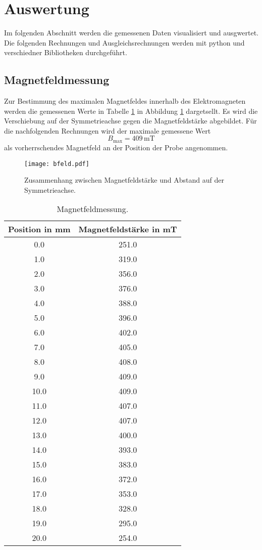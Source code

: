 \section{Auswertung}
\label{sec:Auswertung}

Im folgenden Abschnitt werden die gemessenen Daten visualisiert und ausgwertet.
Die folgenden Rechnungen und Ausgleichsrechnungen werden mit python und verschiedner Bibliotheken durchgeführt.

\subsection{Magnetfeldmessung}
\label{sec:magFeld}

Zur Bestimmung des maximalen Magnetfeldes innerhalb des Elektromagneten werden die gemessenen Werte in Tabelle \ref{tab:magFeld} in Abbildung \ref{abb:magFeld} dargetsellt.
Es wird die Verschiebung auf der Symmetrieachse gegen die Magnetfeldstärke abgebildet.
Für die nachfolgenden Rechnungen wird der maximale gemessene Wert
\begin{equation}
  B_{\text{max}}=409\,\text{mT}
\end{equation}
als vorherrschendes Magnetfeld an der Position der Probe angenommen.
\begin{figure}
  \centering
  \texttt{[image: bfeld.pdf]}
  \caption{Zusammenhang zwischen Magnetfeldstärke und Abstand auf der Symmetrieachse.}
  \label{abb:magFeld}
\end{figure}
\FloatBarrier

\begin{table}
  \centering
  \caption{Magnetfeldmessung.}
  \label{tab:magFeld}
  \begin{tabular}{c | c}
    \toprule
    Position in mm & Magnetfeldstärke in mT \\
    \midrule
    0.0 & 251.0 \\
    1.0 & 319.0 \\
    2.0 & 356.0 \\
    3.0 & 376.0 \\
    4.0 & 388.0 \\
    5.0 & 396.0 \\
    6.0 & 402.0 \\
    7.0 & 405.0 \\
    8.0 & 408.0 \\
    9.0 & 409.0 \\
    10.0 & 409.0 \\
    11.0 & 407.0 \\
    12.0 & 407.0 \\
    13.0 & 400.0 \\
    14.0 & 393.0 \\
    15.0 & 383.0 \\
    16.0 & 372.0 \\
    17.0 & 353.0 \\
    18.0 & 328.0 \\
    19.0 & 295.0 \\
    20.0 & 254.0 \\
    \bottomrule
  \end{tabular}
\end{table}
\FloatBarrier

